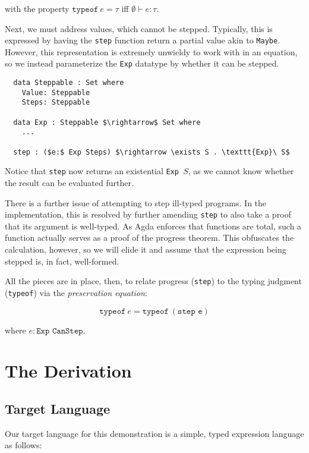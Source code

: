 \documentclass[manuscript,screen,review,sigplan]{acmart}
\begin{document}
with the property $\texttt{typeof}\ e = \tau$ iff $\emptyset \vdash e : \tau$.

Next, we must address values, which cannot be stepped. Typically, this is
expressed by having the \texttt{step} function return a partial value akin to
\texttt{Maybe}. However, this representation is extremely unwieldy to work with
in an equation, so we instead parameterize the \texttt{Exp} datatype by whether
it can be stepped.

\begin{lstlisting}
  data Steppable : Set where
    Value: Steppable
    Steps: Steppable

  data Exp : Steppable $\rightarrow$ Set where
    ...

  step : ($e:$ Exp Steps) $\rightarrow \exists S . \texttt{Exp}\ S$
\end{lstlisting}

Notice that \texttt{step} now returns an existential \texttt{Exp }$S$, as we
cannot know whether the result can be evaluated further.

There is a further issue of attempting to step ill-typed programs. In the
implementation, this is resolved by further amending \texttt{step} to also take
a proof that its argument is well-typed. As Agda enforces that functions are
total, such a function actually serves as a proof of the progress theorem.
This obfuscates the calculation, however, so we will elide it and assume that
the expression being stepped is, in fact, well-formed.

All the pieces are
in place, then, to relate progress (\texttt{step}) to the typing judgment
(\texttt{typeof}) via the \emph{preservation equation}:

\begin{equation}\label{eq:preservation}
  \texttt{typeof}\ e = \texttt{typeof}\ (\texttt{step e})
\end{equation}

where $e : \texttt{Exp CanStep}$.

\section{The Derivation}

\subsection{Target Language}

Our target language for this demonstration is a simple, typed expression
language as follows:
\end{document}
